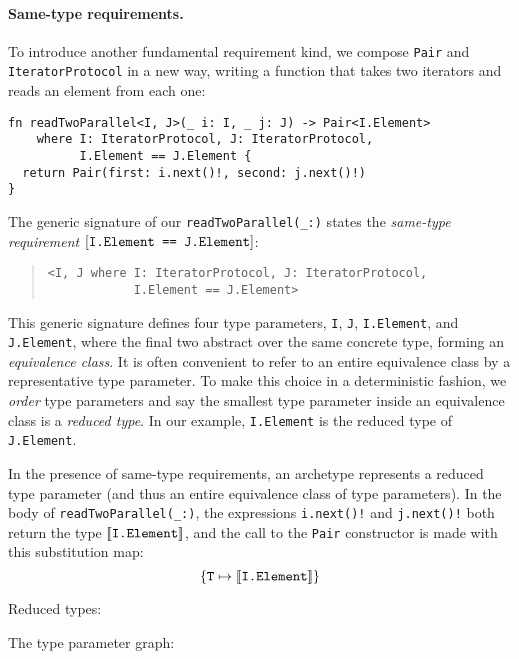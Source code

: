 \documentclass[../generics]{subfiles}
\begin{document}
\paragraph{Same-type requirements.} To introduce another fundamental requirement kind, we compose \texttt{Pair} and \texttt{IteratorProtocol} in a new way, writing a function that takes two iterators and reads an element from each one:
\begin{Verbatim}
fn readTwoParallel<I, J>(_ i: I, _ j: J) -> Pair<I.Element>
    where I: IteratorProtocol, J: IteratorProtocol,
          I.Element == J.Element {
  return Pair(first: i.next()!, second: j.next()!)
}
\end{Verbatim}
The generic signature of our \verb|readTwoParallel(_:)| states the \emph{same-type requirement} $[\texttt{I.Element == J.Element}]$:
\begin{quote}
\begin{verbatim}
<I, J where I: IteratorProtocol, J: IteratorProtocol,
            I.Element == J.Element>
\end{verbatim}
\end{quote}
This generic signature defines four type parameters, \texttt{I}, \texttt{J}, \texttt{I.Element}, and \texttt{J.Element}, where the final two abstract over the same concrete type, forming an \emph{equivalence class}. It is often convenient to refer to an entire equivalence class by a representative type parameter. To make this choice in a deterministic fashion, we \emph{order} type parameters and say the smallest type parameter inside an equivalence class is a \emph{reduced type}. In our example, \texttt{I.Element} is the reduced type of \texttt{J.Element}.

In the presence of same-type requirements, an archetype represents a reduced type parameter (and thus an entire equivalence class of type parameters). In the body of \verb|readTwoParallel(_:)|, the expressions \verb|i.next()!| and \verb|j.next()!| both return the type $[\![\texttt{I.Element}]\!]$, and the call to the \texttt{Pair} constructor is made with this substitution map:
\[\{\texttt{T} \mapsto \texttt{$[\![\texttt{I.Element}]\!]$}\}\]

\begin{MoreDetails}
\item Reduced types: 
\item The type parameter graph: 
\end{MoreDetails}
\end{document}
